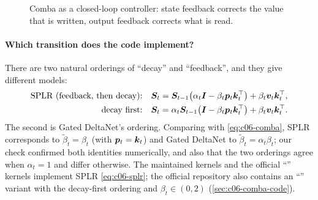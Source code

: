 \begin{figure}[t]
\centering
{}
\caption{Comba as a closed-loop controller: state feedback corrects the value that is
written, output feedback corrects what is read.}
\label{fig:c06-comba-loop}
\end{figure}

\paragraph{Which transition does the code implement?}
There are two natural orderings of ``decay'' and ``feedback'', and they give different
models:
\begin{align}
  \text{SPLR (feedback, then decay):}\quad
  &\bm{S}_t=\bm{S}_{t-1}\big(\alpha_t\bm{I}-\beta_t\bm{p}_t\bm{k}_t^{\top}\big)+\beta_t\bm{v}_t\bm{k}_t^{\top},\label{eq:c06-splr}\\
  \text{decay first:}\quad
  &\bm{S}_t=\alpha_t\bm{S}_{t-1}\big(\bm{I}-\beta_t\bm{p}_t\bm{k}_t^{\top}\big)+\beta_t\bm{v}_t\bm{k}_t^{\top}.\label{eq:c06-decayfirst}
\end{align}
The second is Gated DeltaNet's ordering. Comparing with \eqref{eq:c06-comba}, SPLR
corresponds to $\tilde\beta_t=\beta_t$ (with $\bm{p}_t=\bm{k}_t$) and Gated DeltaNet to
$\tilde\beta_t=\alpha_t\beta_t$; our check confirmed both identities numerically, and also
that the two orderings agree when $\alpha_t=1$ and differ otherwise. The maintained \fla{}
kernels and the official ``'' kernels implement SPLR \eqref{eq:c06-splr}; the
official repository also contains an ``'' variant with the decay-first ordering
and $\beta_t\in(0,2)$ (\cref{sec:c06-comba-code}).

